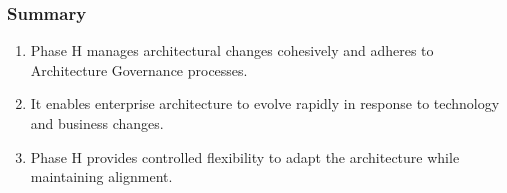 \documentclass[aspectratio=169, table]{beamer}
\begin{document}
	
	
	\begin{frame}
		\frametitle{Summary}
		\begin{enumerate}
			\item Phase H manages architectural changes cohesively and adheres to Architecture Governance processes.
			\item It enables enterprise architecture to evolve rapidly in response to technology and business changes.
			\item Phase H provides controlled flexibility to adapt the architecture while maintaining alignment.
		\end{enumerate}
	\end{frame}
	
\end{document}
